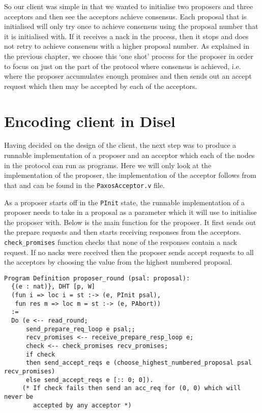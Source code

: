 So our client was simple in that we wanted to initialise two proposers and three
acceptors and then see the acceptors achieve consensus. Each proposal that is initialised
will only try once to achieve consensus using the proposal number that it is initialised
with. If it receives a nack in the process, then it stops and does not retry to
achieve consensus with a higher proposal number. As explained in the previous
chapter, we choose this `one shot' process for the proposer in order to focus on
just on the part of the protocol where consensus is achieved, i.e. where the proposer
accumulates enough promises and then sends out an accept request which then may
be accepted by each of the acceptors.

\section{Encoding client in Disel}
Having decided on the design of the client, the next step was to produce a
runnable implementation of a
proposer and an acceptor which each of the nodes in the protocol can run as programs. Here we
will only look at the implementation of the proposer, the implementation of
the acceptor follows from that and can be found in the \texttt{PaxosAcceptor.v} file.

As a proposer starts off in the \texttt{PInit} state, the runnable implementation
of a proposer needs to take in a proposal as a parameter which it will use to
initialise the proposer with. Below is the main function for the proposer.
It first sends out the prepare requests and then starts receiving responses
from the acceptors. \texttt{check\_promises} function checks that none of the
responses contain a nack request. If no nacks were received then the proposer
sends accept requests to all the acceptors by choosing the value from the
highest numbered proposal.

\begin{lstlisting}
Program Definition proposer_round (psal: proposal):
  {(e : nat)}, DHT [p, W]
  (fun i => loc i = st :-> (e, PInit psal),
   fun res m => loc m = st :-> (e, PAbort))
  :=
  Do (e <-- read_round;
      send_prepare_req_loop e psal;;
      recv_promises <-- receive_prepare_resp_loop e;
      check <-- check_promises recv_promises;
      if check
      then send_accept_reqs e (choose_highest_numbered_proposal psal recv_promises)
      else send_accept_reqs e [:: 0; 0]).
     (* If check fails then send an acc_req for (0, 0) which will never be
        accepted by any acceptor *)
\end{lstlisting}

